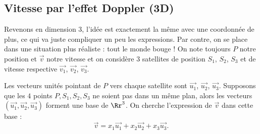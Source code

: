 \documentclass[class=report,crop=false]{standalone}
\newcommand{\vect}{\overrightarrow}
\begin{document}
\subsection{Vitesse par l'effet Doppler (3D)}

Revenons en dimension $3$, l'idée est exactement la même avec une coordonnée de plus, ce qui va juste compliquer
un peu les expressions. Par contre, on se place dans une situation plus réaliste : tout le monde bouge !
On note toujours $P$ notre position et $\vect v$ notre vitesse 
et on considère $3$ satellites de position $S_1$, $S_2$, $S_3$ et de vitesse respective 
$\vect{v_1}$, $\vect{v_2}$, $\vect{v_3}$.


Les vecteurs unités pointant de $P$ vers chaque satellite sont 
$\vect {u_1}$, $\vect {u_2}$, $\vect {u_3}$.
Supposons que les $4$ points $P, S_1, S_2, S_3$ ne soient pas dans un même plan, 
alors les vecteurs $(\vect {u_1}, \vect {u_2}, \vect {u_3})$ forment une base de $\Rr^3$. 
On cherche l'expression de $\vect v$ dans cette base :
$$\vect v = x_1 \vect{u_1}+x_2 \vect{u_2}+x_3 \vect{u_3}.$$
\end{document}
